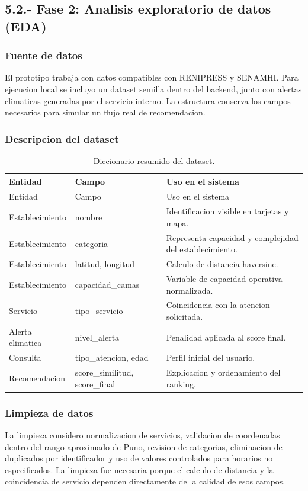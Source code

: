 \documentclass[12pt,a4paper]{article}
\begin{document}
\subsection{5.2.- Fase 2: Analisis exploratorio de datos (EDA)}
\subsubsection{Fuente de datos}
El prototipo trabaja con datos compatibles con RENIPRESS y SENAMHI. Para ejecucion local se incluyo un dataset semilla dentro del backend, junto con alertas climaticas generadas por el servicio interno. La estructura conserva los campos necesarios para simular un flujo real de recomendacion.

\subsubsection{Descripcion del dataset}
\begin{longtable}{p{3.4cm}p{4.2cm}p{6cm}}
\caption{Diccionario resumido del dataset.}
\label{tab:diccionario}\\
\toprule
Entidad & Campo & Uso en el sistema \\
\midrule
\endfirsthead
\toprule
Entidad & Campo & Uso en el sistema \\
\midrule
\endhead
Establecimiento & nombre & Identificacion visible en tarjetas y mapa. \\
Establecimiento & categoria & Representa capacidad y complejidad del establecimiento. \\
Establecimiento & latitud, longitud & Calculo de distancia haversine. \\
Establecimiento & capacidad\_camas & Variable de capacidad operativa normalizada. \\
Servicio & tipo\_servicio & Coincidencia con la atencion solicitada. \\
Alerta climatica & nivel\_alerta & Penalidad aplicada al score final. \\
Consulta & tipo\_atencion, edad & Perfil inicial del usuario. \\
Recomendacion & score\_similitud, score\_final & Explicacion y ordenamiento del ranking. \\
\bottomrule
\end{longtable}

\subsubsection{Limpieza de datos}
La limpieza considero normalizacion de servicios, validacion de coordenadas dentro del rango aproximado de Puno, revision de categorias, eliminacion de duplicados por identificador y uso de valores controlados para horarios no especificados. La limpieza fue necesaria porque el calculo de distancia y la coincidencia de servicio dependen directamente de la calidad de esos campos.
\end{document}

